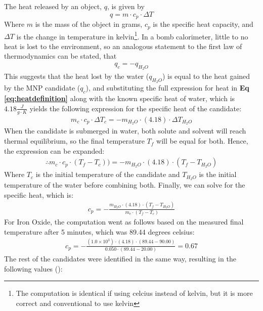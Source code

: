\documentclass[12pt]{article}
\numberwithin{equation}{section}
\numberwithin{equation}{section}
\begin{document}
\noindent The heat released by an object, $q$, is given by
\begin{equation}\label{eq:heatdefinition}
    q = m \cdot c_p \cdot \Delta T
\end{equation}
\noindent Where $m$ is the mass of the object in grams, $c_p$ is the specific heat capacity, and $\Delta T$ is the change in temperature in kelvin\footnote{The computation is identical if using celcius instead of kelvin, but it is more correct and conventional to use kelvin}. In a bomb calorimeter, little to no heat is lost to the environment, so an analogous statement to the first law of thermodynamics can be stated, that
\begin{gather*}
    q_{c} = -q_{H_2 O}
\end{gather*}
\noindent This suggests that the heat lost by the water ($q_{H_2O}$) is equal to the heat gained by the MNP candidate ($q_c$), and substituting the full expression for heat in \textbf{Eq \ref{eq:heatdefinition}} along with the known specific heat of water, which is $4.18 \frac{J}{g \cdot K}$ yields the following expression for the specific heat of the candidate:
\begin{gather*}
m_c \cdot c_p \cdot \Delta T_c = -m_{H_2O} \cdot (4.18) \cdot \Delta T_{H_2O}
\end{gather*}
\noindent When the candidate is submerged in water, both solute and solvent will reach thermal equilibrium, so the final temperature $T_f$ will be equal for both. Hence, the expression can be expanded:
\begin{gather*}
    \therefore m_c \cdot c_p \cdot (T_f - T_c)) = -m_{H_2O} \cdot (4.18) \cdot (T_f - T_{H_2O}) 
\end{gather*}
Where $T_c$ is the initial temperature of the candidate and $T_{H_2O}$ is the initial temperature of the water before combining both. Finally, we can solve for the specific heat, which is:
\begin{gather*}
       c_p  = -\frac{m_{H_2O} \cdot (4.18) \cdot(T_f - T_{H_2O})} {m_c \cdot (T_f - T_c)}
\end{gather*}
For Iron Oxide, the computation went as follows based on the measured final temperature after 5 minutes, which was 89.44 degrees celsius: 
\begin{gather*}
       c_p  = -\frac{(1.0 \times 10^3) \cdot (4.18) \cdot(89.44 - 90.00)} {0.050 \cdot (89.44 - 20.00)} = 0.67
\end{gather*}
The rest of the candidates were identified in the same way, resulting in the following values (\cite{specificheatinfo}):
\end{document}
